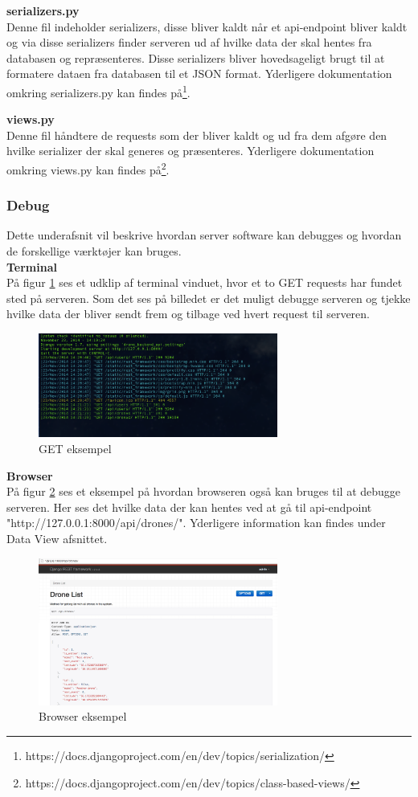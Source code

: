 \textbf{serializers.py} \\
Denne fil indeholder serializers, disse bliver kaldt når et api-endpoint bliver kaldt og via disse serializers finder serveren ud af hvilke data der skal hentes fra databasen og repræsenteres. Disse serializers bliver hovedsageligt brugt til at formatere dataen fra databasen til et JSON format. Yderligere dokumentation omkring serializers.py kan findes på\footnote{https://docs.djangoproject.com/en/dev/topics/serialization/}.

\textbf{views.py} \\
Denne fil håndtere de requests som der bliver kaldt og ud fra dem afgøre den hvilke serializer der skal generes og præsenteres. Yderligere dokumentation omkring views.py kan findes på\footnote{https://docs.djangoproject.com/en/dev/topics/class-based-views/}.
\newpage

\subsubsection{Debug}
Dette underafsnit vil beskrive hvordan server software kan debugges og hvordan de forskellige værktøjer kan bruges.\\

\textbf{Terminal}\\
På figur \ref{fig:get_eksempel} ses et udklip af terminal vinduet, hvor et to GET requests har fundet sted på serveren. Som det ses på billedet er det muligt debugge serveren og tjekke hvilke data der bliver sendt frem og tilbage ved hvert request til serveren. 

\begin{figure}[H]
	\centering
	\includegraphics[width=0.7\textwidth]{Billeder/implementation/get_eksempel.png}
	\caption{GET eksempel}
	\label{fig:get_eksempel}
\end{figure}

\textbf{Browser}\\
På figur \ref{fig:browser_eksempel} ses et eksempel på hvordan browseren også kan bruges til at debugge serveren. Her ses det hvilke data der kan hentes ved at gå til api-endpoint\\
"http://127.0.0.1:8000/api/drones/". Yderligere information kan findes under Data View afsnittet.

\begin{figure}[H]
	\centering
	\includegraphics[width=0.7\textwidth]{Billeder/implementation/browser_eksempel.png}
	\caption{Browser eksempel}
	\label{fig:browser_eksempel}
\end{figure}
